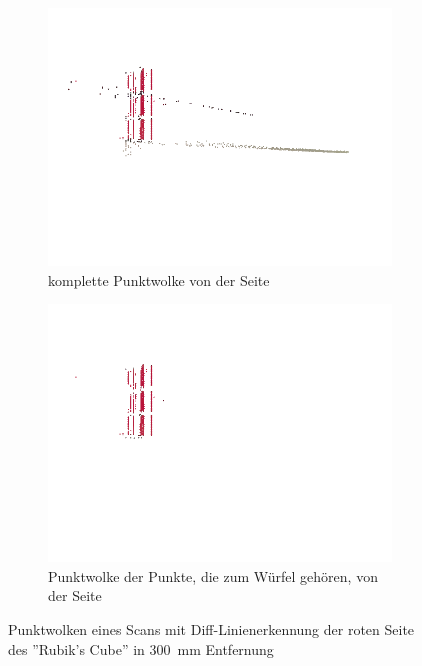 \documentclass[ngerman,a4paper,parskip=half]{scrartcl}
\begin{document}
\begin{figure}[H]
\begin{subfigure}{0.45\textwidth}
		\includegraphics[width=\textwidth,frame,trim=0 120 0 20,clip]{includes/diff_red_pos1.png}
		\caption{komplette Punktwolke von der Seite \\ \mbox{}}
	\end{subfigure}
	\hfill
	\begin{subfigure}{0.45\textwidth}
		\includegraphics[width=\textwidth,frame,trim=0 120 0 20,clip]{includes/diff_only_red_pos1.png}
		\caption{Punktwolke der Punkte, die zum Würfel gehören, von der Seite}
	\end{subfigure}
	\caption{Punktwolken eines Scans mit Diff-Linienerkennung der roten Seite des ''Rubik's Cube'' in 300~mm Entfernung}
\end{figure}
\end{document}

